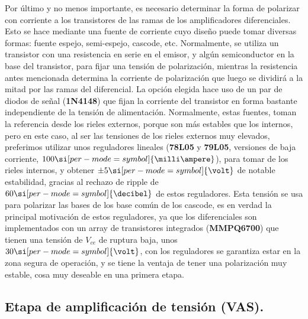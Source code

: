 Por último y no menos importante, es necesario determinar la forma de polarizar con corriente a los transistores de las ramas de los amplificadores diferenciales. Esto se hace mediante una fuente de corriente cuyo diseño puede tomar diversas formas: fuente espejo, semi-espejo, cascode, etc. Normalmente, se utiliza un transistor con una resistencia en serie en el emisor, y algún semiconductor en la base del transistor, para fijar una tensión de polarización, mientras la resistencia antes mencionada determina la corriente de polarización que luego se dividirá a la mitad por las ramas del diferencial. La opción elegida hace uso de un par de diodos de señal (\textbf{1N4148}) que fijan la corriente del transistor en forma bastante independiente de la tensión de alimentación. Normalmente, estas fuentes, toman la referencia desde los rieles externos, porque son más estables que los internos, pero en este caso, al ser las tensiones de los rieles externos muy elevados, preferimos utilizar unos reguladores lineales (\textbf{78L05} y \textbf{79L05}, versiones de baja corriente, $100 \si[per-mode=symbol]{\milli\ampere}$), para tomar de los rieles internos, y obtener $\pm 5 \si[per-mode=symbol]{\volt}$ de notable estabilidad, gracias al rechazo de ripple de $60 \si[per-mode=symbol]{\decibel}$ de estos reguladores. Esta tensión se usa para polarizar las bases de los base común de los cascode, es en verdad la principal motivación de estos reguladores, ya que los diferenciales son implementados con un array de transistores integrados (\textbf{MMPQ6700}) que tienen una tensión de $V_{ce}$ de ruptura baja, unos $30 \si[per-mode=symbol]{\volt}$, con los reguladores se garantiza estar en la zona segura de operación, y se tiene la ventaja de tener una polarización muy estable, cosa muy deseable en una primera etapa.


\subsection{Etapa de amplificación de tensión (VAS).}

